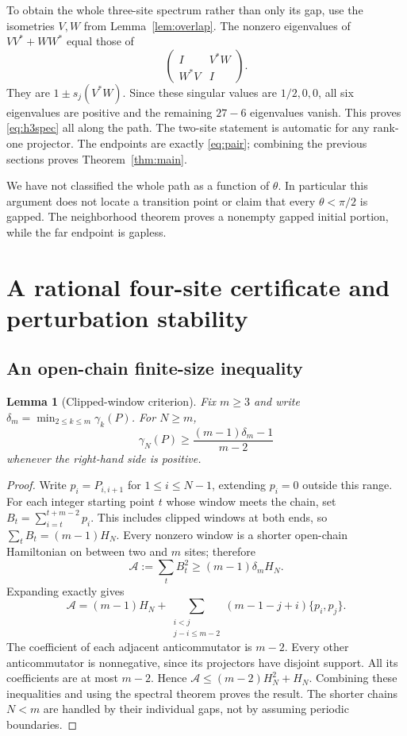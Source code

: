 \documentclass[11pt,a4paper]{article}
\newtheorem{lemma}[theorem]{Lemma}
\theoremstyle{remark}\newtheorem{remark}[theorem]{Remark}
\begin{document}
To obtain the whole three-site spectrum rather than only its gap, use the isometries $V,W$ from Lemma~\ref{lem:overlap}. The nonzero eigenvalues of $VV^*+WW^*$ equal those of
\[
 \begin{pmatrix}I&V^*W\\W^*V&I\end{pmatrix}.
\]
They are $1\pm s_j(V^*W)$. Since these singular values are $1/2,0,0$, all six eigenvalues are positive and the remaining $27-6$ eigenvalues vanish. This proves \eqref{eq:h3spec} all along the path. The two-site statement is automatic for any rank-one projector. The endpoints are exactly \eqref{eq:pair}; combining the previous sections proves Theorem~\ref{thm:main}.

We have not classified the whole path as a function of $\theta$. In particular this argument does not locate a transition point or claim that every $\theta<\pi/2$ is gapped. The neighborhood theorem proves a nonempty gapped initial portion, while the far endpoint is gapless.

\section{A rational four-site certificate and perturbation stability}\label{sec:certificate}
\subsection{An open-chain finite-size inequality}
\begin{lemma}[Clipped-window criterion]\label{lem:windows}
Fix $m\ge3$ and write $\delta_m=\min_{2\le k\le m}\gamma_k(P)$. For $N\ge m$,
\begin{equation}\label{eq:finite-size}
 \gamma_N(P)\ge\frac{(m-1)\delta_m-1}{m-2}
\end{equation}
whenever the right-hand side is positive.
\end{lemma}
\begin{proof}
Write $p_i=P_{i,i+1}$ for $1\le i\le N-1$, extending $p_i=0$ outside this range. For each integer starting point $t$ whose window meets the chain, set
$B_t=\sum_{i=t}^{t+m-2}p_i$. This includes clipped windows at both ends, so
$\sum_tB_t=(m-1)H_N$. Every nonzero window is a shorter open-chain Hamiltonian on between two and $m$ sites; therefore
\[
 \mathcal A:=\sum_tB_t^2\ge(m-1)\delta_m H_N.
\]
Expanding exactly gives
\[
 \mathcal A=(m-1)H_N+
 \sum_{\substack{i<j\\j-i\le m-2}}(m-1-j+i)\{p_i,p_j\}.
\]
The coefficient of each adjacent anticommutator is $m-2$. Every other anticommutator is nonnegative, since its projectors have disjoint support. All its coefficients are at most $m-2$. Hence
$\mathcal A\le(m-2)H_N^2+H_N$.
Combining these inequalities and using the spectral theorem proves the result. The shorter chains $N<m$ are handled by their individual gaps, not by assuming periodic boundaries.
\end{proof}
\end{document}
